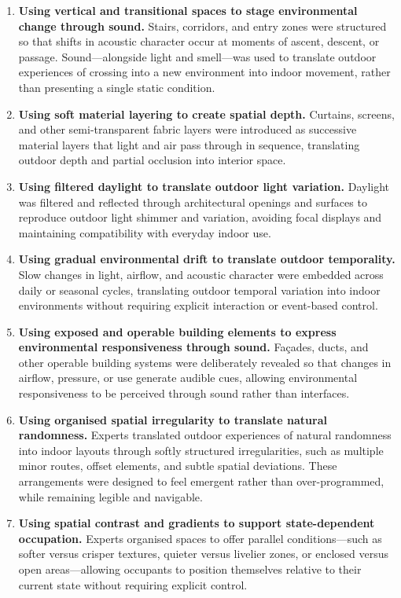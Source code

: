 \begin{enumerate}
\item \textbf{Using vertical and transitional spaces to stage environmental change through sound.}  Stairs, corridors, and entry zones were structured so that shifts in acoustic character occur at moments of ascent, descent, or passage. Sound—alongside light and smell—was used to translate outdoor experiences of crossing into a new environment into indoor movement, rather than presenting a single static condition.

\item \textbf{Using soft material layering to create spatial depth.}  Curtains, screens, and other semi-transparent fabric layers were introduced as successive material layers that light and air pass through in sequence, translating outdoor depth and partial occlusion into interior space.

\item \textbf{Using filtered daylight to translate outdoor light variation.}  Daylight was filtered and reflected through architectural openings and surfaces to reproduce outdoor light shimmer and variation, avoiding focal displays and maintaining compatibility with everyday indoor use.

\item \textbf{Using gradual environmental drift to translate outdoor temporality.}  Slow changes in light, airflow, and acoustic character were embedded across daily or seasonal cycles, translating outdoor temporal variation into indoor environments without requiring explicit interaction or event-based control.

\item \textbf{Using exposed and operable building elements to express environmental responsiveness through sound.}  Façades, ducts, and other operable building systems were deliberately revealed so that changes in airflow, pressure, or use generate audible cues, allowing environmental responsiveness to be perceived through sound rather than interfaces.

\item \textbf{Using organised spatial irregularity to translate natural randomness.}  Experts translated outdoor experiences of natural randomness into indoor layouts through softly structured irregularities, such as multiple minor routes, offset elements, and subtle spatial deviations. These arrangements were designed to feel emergent rather than over-programmed, while remaining legible and navigable.

\item \textbf{Using spatial contrast and gradients to support state-dependent occupation.}  Experts organised spaces to offer parallel conditions—such as softer versus crisper textures, quieter versus livelier zones, or enclosed versus open areas—allowing occupants to position themselves relative to their current state without requiring explicit control.
\end{enumerate}

